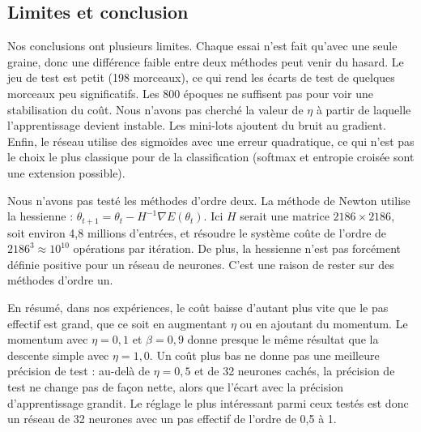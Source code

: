 \subsection{Limites et conclusion}

Nos conclusions ont plusieurs limites. Chaque essai n'est fait qu'avec une
seule graine, donc une différence faible entre deux méthodes peut venir
du hasard. Le jeu de test est petit (198 morceaux), ce qui rend les écarts
de test de quelques morceaux peu significatifs. Les 800 époques ne suffisent
pas pour voir une stabilisation du coût. Nous n'avons pas cherché la valeur
de $\eta$ à partir de laquelle l'apprentissage devient instable. Les
mini-lots ajoutent du bruit au gradient. Enfin, le réseau utilise des
sigmoïdes avec une erreur quadratique, ce qui n'est pas le choix le plus
classique pour de la classification (softmax et entropie croisée sont une
extension possible).

Nous n'avons pas testé les méthodes d'ordre deux. La méthode de Newton
utilise la hessienne : $\theta_{t+1} = \theta_t - H^{-1}\nabla E(\theta_t)$.
Ici $H$ serait une matrice $2186 \times 2186$, soit environ 4,8 millions
d'entrées, et résoudre le système coûte de l'ordre de $2186^3
\approx 10^{10}$ opérations par itération. De plus, la hessienne n'est
pas forcément définie positive pour un réseau de neurones. C'est une
raison de rester sur des méthodes d'ordre un.

En résumé, dans nos expériences, le coût baisse d'autant plus vite que le pas
effectif est grand, que ce soit en augmentant $\eta$ ou en ajoutant du
momentum. Le momentum avec $\eta = 0{,}1$ et $\beta = 0{,}9$ donne presque le
même résultat que la descente simple avec $\eta = 1{,}0$. Un coût plus bas ne
donne pas une meilleure précision de test : au-delà de $\eta = 0{,}5$ et de
32 neurones cachés, la précision de test ne change pas de façon nette, alors
que l'écart avec la précision d'apprentissage grandit. Le réglage le plus
intéressant parmi ceux testés est donc un réseau de 32 neurones avec un pas
effectif de l'ordre de 0,5 à 1.


